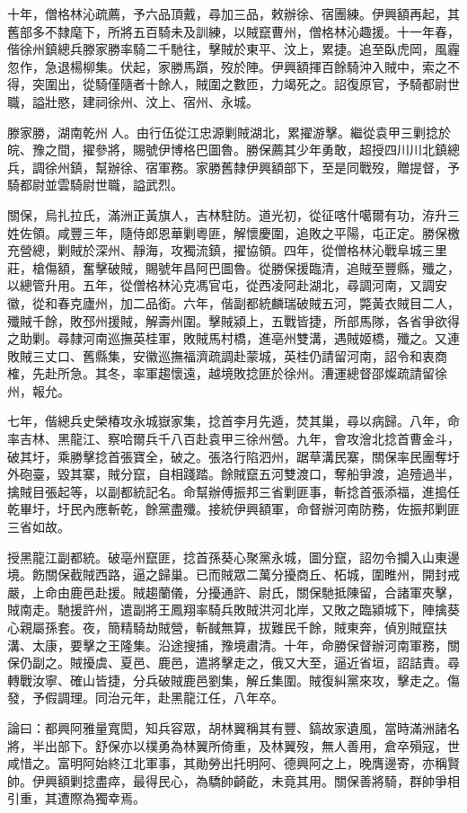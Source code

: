 \begin{pinyinscope}
十年，僧格林沁疏薦，予六品頂戴，尋加三品，敕辦徐、宿團練。伊興額再起，其舊部多不隸麾下，所將五百騎未及訓練，以賊竄曹州，僧格林沁趣援。十一年春，偕徐州鎮總兵滕家勝率騎二千馳往，擊賊於東平、汶上，累捷。追至臥虎岡，風霾忽作，急退楊柳集。伏起，家勝馬躓，歿於陣。伊興額揮百餘騎沖入賊中，索之不得，突圍出，從騎僅隨者十餘人，賊圍之數匝，力竭死之。詔復原官，予騎都尉世職，謚壯愍，建祠徐州、汶上、宿州、永城。

滕家勝，湖南乾州人。由行伍從江忠源剿賊湖北，累擢游擊。繼從袁甲三剿捻於皖、豫之間，擢參將，賜號伊博格巴圖魯。勝保薦其少年勇敢，超授四川川北鎮總兵，調徐州鎮，幫辦徐、宿軍務。家勝舊隸伊興額部下，至是同戰歿，贈提督，予騎都尉並雲騎尉世職，謚武烈。

關保，烏扎拉氏，滿洲正黃旗人，吉林駐防。道光初，從征喀什噶爾有功，洊升三姓佐領。咸豐三年，隨侍郎恩華剿粵匪，解懷慶圍，追敗之平陽，屯正定。勝保檄充營總，剿賊於深州、靜海，攻獨流鎮，擢協領。四年，從僧格林沁戰阜城三里莊，槍傷額，奮擊破賊，賜號年昌阿巴圖魯。從勝保援臨清，追賊至豐縣，殲之，以總管升用。五年，從僧格林沁克馮官屯，從西凌阿赴湖北，尋調河南，又調安徽，從和春克廬州，加二品銜。六年，偕副都統麟瑞破賊五河，斃黃衣賊目二人，殲賊千餘，敗邳州援賊，解壽州圍。擊賊潁上，五戰皆捷，所部馬隊，各省爭欲得之助剿。尋隸河南巡撫英桂軍，敗賊馬村橋，進亳州雙溝，遇賊姬橋，殲之。又連敗賊三丈口、舊縣集，安徽巡撫福濟疏調赴蒙城，英桂仍請留河南，詔令和衷商榷，先赴所急。其冬，率軍趨懷遠，越境敗捻匪於徐州。漕運總督邵燦疏請留徐州，報允。

七年，偕總兵史榮椿攻永城嶽家集，捻首李月先遁，焚其巢，尋以病歸。八年，命率吉林、黑龍江、察哈爾兵千八百赴袁甲三徐州營。九年，會攻澮北捻首曹金斗，破其圩，乘勝擊捻首張寶全，破之。張洛行陷泗州，踞草溝民寨，關保率民團奪圩外砲臺，毀其寨，賊分竄，自相踐踏。餘賊竄五河雙渡口，奪船爭渡，追殪過半，擒賊目張起等，以副都統記名。命幫辦傅振邦三省剿匪事，斬捻首張添福，進搗任乾畢圩，圩民內應斬乾，餘黨盡殲。接統伊興額軍，命督辦河南防務，佐振邦剿匪三省如故。

授黑龍江副都統。破亳州竄匪，捻首孫葵心聚黨永城，圖分竄，詔勿令攔入山東邊境。飭關保截賊西路，逼之歸巢。已而賊眾二萬分擾商丘、柘城，圍睢州，開封戒嚴，上命由鹿邑赴援。賊趨蘭儀，分擾通許、尉氏，關保馳抵陳留，合諸軍夾擊，賊南走。馳援許州，遣副將王鳳翔率騎兵敗賊洪河北岸，又敗之臨潁城下，陣擒葵心親屬孫套。夜，簡精騎劫賊營，斬馘無算，拔難民千餘，賊東奔，偵別賊竄扶溝、太康，要擊之王隆集。沿途搜捕，豫境肅清。十年，命勝保督辦河南軍務，關保仍副之。賊擾虞、夏邑、鹿邑，遣將擊走之，俄又大至，逼近省垣，詔詰責。尋轉戰汝寧、確山皆捷，分兵破賊鹿邑劉集，解丘集圍。賊復糾黨來攻，擊走之。傷發，予假調理。同治元年，赴黑龍江任，八年卒。

論曰：都興阿雅量寬閎，知兵容眾，胡林翼稱其有豐、鎬故家遺風，當時滿洲諸名將，半出部下。舒保亦以樸勇為林翼所倚重，及林翼歿，無人善用，倉卒殞寇，世咸惜之。富明阿始終江北軍事，其勛勞出托明阿、德興阿之上，晚膺邊寄，亦稱賢帥。伊興額剿捻盡瘁，最得民心，為驕帥齮齕，未竟其用。關保善將騎，群帥爭相引重，其遭際為獨幸焉。


\end{pinyinscope}